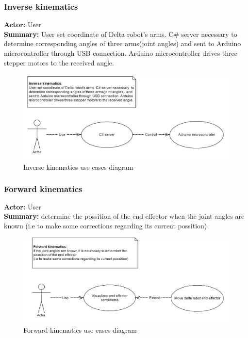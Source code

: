 \subsubsection{Inverse kinematics}
\textbf{Actor:} User \\
\textbf{Summary:} User set coordinate of Delta robot's arms. C\# server necessary  to determine corresponding angles of three arms(joint angles)  and sent to Arduino microcontroller through USB connection. Arduino microcontroller drives three stepper motors to the received angle.
\begin{figure}[H]
	\centering
	\includegraphics[width=\maxwidth{15cm}, keepaspectratio]{Chapters/Fig/usecase_inverse_kinematics.png}
	\caption{Inverse kinematics use cases diagram}
	\label{fig:usecase_inverse_kinematics}
\end{figure}

\subsubsection{Forward kinematics}
\textbf{Actor:} User \\
\textbf{Summary:} determine the possition of the end effector when the joint angles are known  
(i.e to make some corrections regarding its current possition)
\begin{figure}[H]
	\centering
	\includegraphics[width=\maxwidth{15cm}, keepaspectratio]{Chapters/Fig/usecase_forward_kinematics.png}
	\caption{Forward kinematics use cases diagram}
	\label{fig:usecase_forward_kinematics}
\end{figure}

